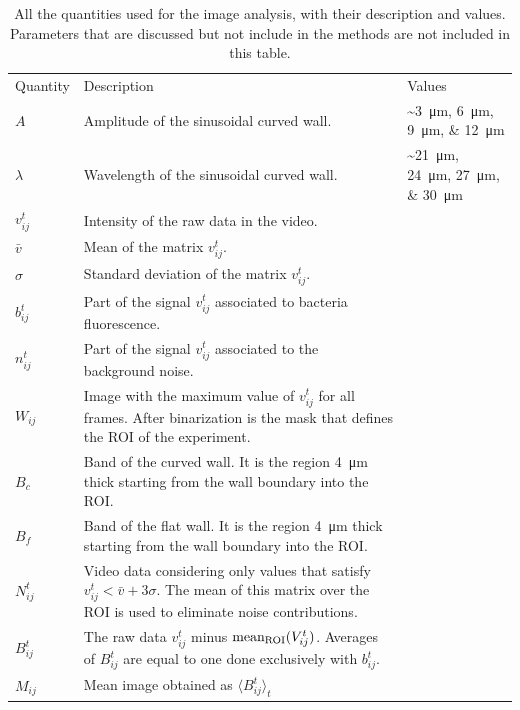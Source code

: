 \begin{table}[!h]
   \centering
    \small
    \caption[Summary of all quantities used in the image analysis]{All the quantities used for the image analysis, with their description and values. Parameters that are discussed but not include in the methods are not included in this table. }
    \begin{tabularx}{\textwidth}{lXl}
    \hline\noalign{\smallskip}
         Quantity  & Description & Values   \\
    \noalign{\smallskip}\hline\noalign{\smallskip}
         $A$ & Amplitude of the sinusoidal curved wall. & \sim \SIlist[list-units=single, list-final-separator = {, }]{3;6;9;12}{\micro\meter} \\ 
         $\lambda$ & Wavelength of the sinusoidal curved wall. & \sim \SIlist[list-units=single, list-final-separator = {, }]{21;24;27;30}{\micro\meter} \\
         $v_{ij}^t$ & Intensity of the raw data in the video. & \quad \\
         $\bar{v}$ & Mean of the matrix $v_{ij}^t$. & \quad \\
         $\sigma$ & Standard deviation of the matrix $v_{ij}^t$. & \quad \\
         $b_{ij}^t$ & Part of the signal $v_{ij}^t$ associated to bacteria fluorescence. & \quad \\
         $n_{ij}^t$ & Part of the signal $v_{ij}^t$ associated to the background noise. & \quad \\
         $W_{ij}$ & Image with the maximum value of $v_{ij}^t$ for all frames. After binarization is the mask that defines the ROI of the experiment. & \quad \\
         $B_c$ & Band of the curved wall. It is the region \SI{4}{\micro\meter} thick starting from the wall boundary into the ROI.  & \quad \\
         $B_f$ & Band of the flat wall. It is the region \SI{4}{\micro\meter} thick starting from the wall boundary into the ROI.  & \quad \\
         $N_{ij}^t$ & Video data considering only values that satisfy $v_{ij}^t  < \bar{v} + 3 \sigma$. The mean of this matrix over the ROI is used to eliminate noise contributions.  & \quad \\
         $B_{ij}^t$ & The raw data $v_{ij}^t$ minus ${\rm mean_{ROI}}(V_{ij}^t)$. Averages of $B_{ij}^t$ are equal to one done exclusively with $b_{ij}^t$.  & \quad \\
         $M_{ij}$ & Mean image obtained as $\langle B_{ij}^t \rangle_t$  & \quad \\

\end{tabularx}
\end{table}
